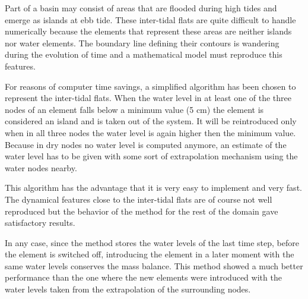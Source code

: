 Part of a basin may consist of areas that are
flooded during high tides and emerge as islands at ebb tide. These
inter-tidal flats are quite difficult to handle numerically because
the elements that represent these areas are neither
islands nor water elements. The boundary line defining their
contours is wandering during the evolution
of time and a mathematical model must reproduce this features.

For reasons of computer time savings, a simplified algorithm has been chosen
to represent the inter-tidal flats. When the water level in at least
one of the three nodes of an element falls below a minimum value (5 cm)
the element is considered an island and is taken out of the system.
It will be reintroduced only when in all three
nodes the water level is again higher then the minimum value.
Because in dry nodes no water level is computed anymore, an estimate
of the water level has to be given with some sort of extrapolation mechanism
using the water nodes nearby.

This algorithm has the advantage that it is very easy to
implement and very fast. The dynamical features close to the
inter-tidal flats are of course not well reproduced but the
behavior of the method for the rest of the domain
gave satisfactory results.

In any case, since the method stores the water levels of the
last time step, before the element is switched off, introducing the
element in a later moment with the same water levels conserves the
mass balance. This method showed a much better performance
than the one where the new elements were introduced with the water
levels taken from the extrapolation of the surrounding nodes.


